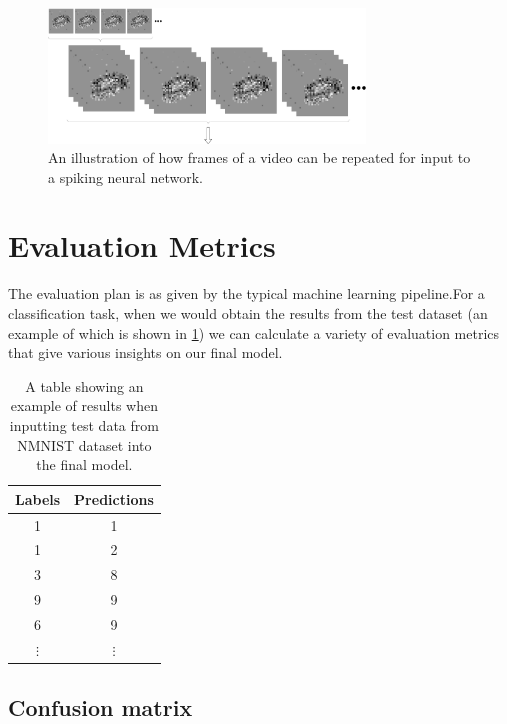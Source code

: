\begin{figure}[htb]
    \centering
    \includegraphics[width=0.75\textwidth]{analysisanddesign/images/sustained_video.png}
    \caption{An illustration of how frames of a video can be repeated for input to a spiking neural network.}
    \label{fig:sustained_video}
\end{figure}

\section{Evaluation Metrics} \label{sec:evalutaion_metrics}

The evaluation plan is as given by the typical machine learning pipeline\cite{IntroToML}.For a classification task, when we would obtain the results from the test dataset (an example of which is shown in \cref{tab:possible_results}) we can calculate a variety of evaluation metrics that give various insights on our final model.

\begin{table}[htb]
    \centering
    \begin{tabular}{|| c  | c ||}
        \hline
        Labels     & Predictions \\
        \hline \hline
        1          & 1           \\
        \hline
        1          & 2           \\
        \hline
        3          & 8           \\
        \hline
        9          & 9           \\
        \hline
        6          & 9           \\
        \hline
        $ \vdots $ & $ \vdots $  \\
    \end{tabular}
    \caption{A table showing an example of results when inputting test data from NMNIST dataset\cite{NMNIST} into the final model.}
    \label{tab:possible_results}
\end{table}

\subsection{Confusion matrix}

